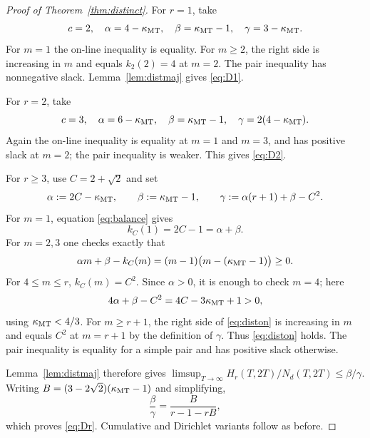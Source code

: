 \begin{proof}[Proof of Theorem~\ref{thm:distinct}]
For $r=1$, take
\[
c=2,
\quad \alpha=4-\kappa_{\mathrm{MT}},
\quad \beta=\kappa_{\mathrm{MT}}-1,
\quad \gamma=3-\kappa_{\mathrm{MT}}.
\]
For $m=1$ the on-line inequality is equality.  For $m\geq2$, the right side is increasing in $m$ and equals $k_2(2)=4$ at $m=2$.  The pair inequality has nonnegative slack.  Lemma~\ref{lem:distmaj} gives \eqref{eq:D1}.

For $r=2$, take
\[
c=3,
\quad \alpha=6-\kappa_{\mathrm{MT}},
\quad \beta=\kappa_{\mathrm{MT}}-1,
\quad \gamma=2(4-\kappa_{\mathrm{MT}}).
\]
Again the on-line inequality is equality at $m=1$ and $m=3$, and has positive slack at $m=2$; the pair inequality is weaker.  This gives \eqref{eq:D2}.

For $r\geq3$, use $C=2+\sqrt2$ and set
\begin{equation}\label{eq:distparams}
\alpha:=2C-\kappa_{\mathrm{MT}},
\qquad
\beta:=\kappa_{\mathrm{MT}}-1,
\qquad
\gamma:=\alpha(r+1)+\beta-C^2.
\end{equation}
For $m=1$, equation \eqref{eq:balance} gives
\[
k_C(1)=2C-1=\alpha+\beta.
\]
For $m=2,3$ one checks exactly that
\begin{equation}\label{eq:smallslack}
\alpha m+\beta-k_C(m)=(m-1)\bigl(m-(\kappa_{\mathrm{MT}}-1)\bigr)\geq0.
\end{equation}
For $4\leq m\leq r$, $k_C(m)=C^2$.  Since $\alpha>0$, it is enough to check $m=4$; here
\[
4\alpha+\beta-C^2=4C-3\kappa_{\mathrm{MT}}+1>0,
\]
using $\kappa_{\mathrm{MT}}<4/3$.  For $m\geq r+1$, the right side of \eqref{eq:diston} is increasing in $m$ and equals $C^2$ at $m=r+1$ by the definition of $\gamma$.  Thus \eqref{eq:diston} holds.  The pair inequality is equality for a simple pair and has positive slack otherwise.

Lemma~\ref{lem:distmaj} therefore gives
$\limsup_{T\to\infty}H_r(T,2T)/N_d(T,2T)\leq\beta/\gamma$.  Writing $B=(3-2\sqrt2)(\kappa_{\mathrm{MT}}-1)$ and simplifying,
\[
\frac{\beta}{\gamma}=\frac{B}{r-1-rB},
\]
which proves \eqref{eq:Dr}.  Cumulative and Dirichlet variants follow as before.
\end{proof}
